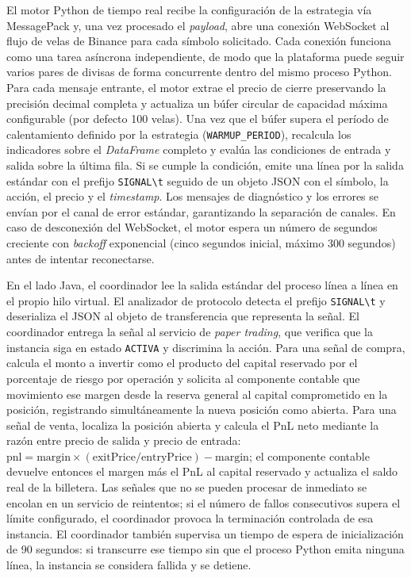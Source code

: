 El motor Python de tiempo real recibe la configuración de la estrategia
vía MessagePack y, una vez procesado el \textit{payload}, abre una conexión
WebSocket al flujo de velas de Binance para cada símbolo solicitado. Cada
conexión funciona como una tarea asíncrona independiente, de modo que la
plataforma puede seguir varios pares de divisas de forma concurrente dentro
del mismo proceso Python. Para cada mensaje entrante, el motor extrae el
precio de cierre preservando la precisión decimal completa y actualiza un
búfer circular de capacidad máxima configurable (por defecto 100 velas). Una
vez que el búfer supera el período de calentamiento definido por la estrategia
(\texttt{WARMUP\_PERIOD}), recalcula los indicadores sobre el
\textit{DataFrame} completo y evalúa las condiciones de entrada y salida sobre
la última fila. Si se cumple la condición, emite una línea por la salida
estándar con el prefijo \texttt{SIGNAL\textbackslash t} seguido de un objeto
JSON con el símbolo, la acción, el precio y el \textit{timestamp}. Los
mensajes de diagnóstico y los errores se envían por el canal de error
estándar, garantizando la separación de canales. En caso de desconexión del
WebSocket, el motor espera un número de segundos creciente con
\textit{backoff} exponencial (cinco segundos inicial, máximo 300 segundos)
antes de intentar reconectarse.

En el lado Java, el coordinador lee la salida estándar del proceso línea a
línea en el propio hilo virtual. El analizador de protocolo detecta el prefijo
\texttt{SIGNAL\textbackslash t} y deserializa el JSON al objeto de
transferencia que representa la señal. El coordinador entrega la señal al
servicio de \textit{paper trading}, que verifica que la instancia siga en
estado \texttt{ACTIVA} y discrimina la acción. Para una señal de compra,
calcula el monto a invertir como el producto del capital reservado por el
porcentaje de riesgo por operación y solicita al componente contable que
movimiento ese margen desde la reserva general al capital comprometido en la
posición, registrando simultáneamente la nueva posición como abierta. Para
una señal de venta, localiza la posición abierta y calcula el PnL neto
mediante la razón entre precio de salida y precio de entrada:
$\text{pnl} = \text{margin} \times (\text{exitPrice} / \text{entryPrice}) - \text{margin}$;
el componente contable devuelve entonces el margen más el PnL al capital
reservado y actualiza el saldo real de la billetera. Las señales que no se
pueden procesar de inmediato se encolan en un servicio de reintentos; si el
número de fallos consecutivos supera el límite configurado, el coordinador
provoca la terminación controlada de esa instancia. El coordinador también
supervisa un tiempo de espera de inicialización de 90 segundos: si transcurre
ese tiempo sin que el proceso Python emita ninguna línea, la instancia se
considera fallida y se detiene.

